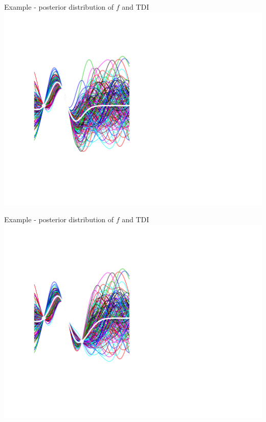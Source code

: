 \documentclass[ignorenonframetext,xcolor=pdflatex,table,dvipsnames,serif]{beamer}
\begin{document}
\begin{frame}{Example - posterior distribution of $f$ and TDI}
  \center\includegraphics[scale=0.5]{probAni03}
\end{frame}
\begin{frame}{Example - posterior distribution of $f$ and TDI}
  \center\includegraphics[scale=0.5]{probAni04}
\end{frame}
\end{document}
